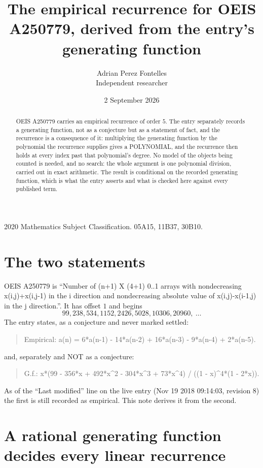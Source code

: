 \documentclass[11pt,a4paper]{article}
\title{The empirical recurrence for OEIS A250779, derived from the entry's generating function}
\author{Adrian Perez Fontelles\\ \small Independent researcher}
\date{2 September 2026}
\theoremstyle{plain}
\theoremstyle{definition}
\begin{document}
\maketitle

\begin{abstract}
OEIS A250779 carries an empirical recurrence of order $5$. The entry separately records a
generating function, not as a conjecture but as a statement of fact, and the recurrence is a
consequence of it: multiplying the generating function by the polynomial the recurrence
supplies gives a POLYNOMIAL, and the recurrence then holds at every index past that
polynomial's degree. No model of the objects being counted is needed, and no search: the
whole argument is one polynomial division, carried out in exact arithmetic. The result is
conditional on the recorded generating function, which is what the entry asserts and what is
checked here against every published term.
\end{abstract}

\noindent\small 2020 Mathematics Subject Classification. 05A15, 11B37, 30B10.\normalsize

\section{The two statements}

OEIS A250779 is ``Number of (n+1) X (4+1) 0..1 arrays with nondecreasing x(i,j)+x(i,j-1) in the i direction and nondecreasing absolute value of x(i,j)-x(i-1,j) in the j direction.''. It has offset $1$ and begins
\[
99, 238, 534, 1152, 2426, 5028, 10306, 20960,\ \dots
\]
The entry states, as a conjecture and never marked settled:
\begin{quote}
Empirical: a(n) = 6*a(n-1) - 14*a(n-2) + 16*a(n-3) - 9*a(n-4) + 2*a(n-5).
\end{quote}
and, separately and NOT as a conjecture:
\begin{quote}
G.f.: x*(99 - 356*x + 492*x\^{}2 - 304*x\^{}3 + 73*x\^{}4) / ((1 - x)\^{}4*(1 - 2*x)).
\end{quote}
As of the ``Last modified'' line on the live entry (Nov 19 2018 09:14:03, revision 8) the first is still
recorded as empirical. This note derives it from the second.

\section{A rational generating function decides every linear recurrence}
\end{document}
